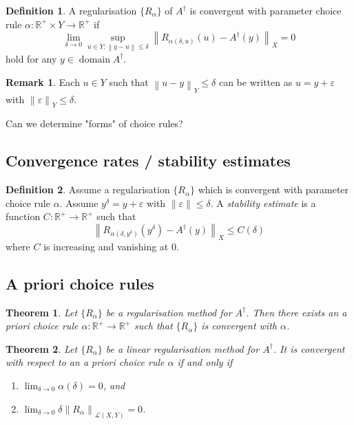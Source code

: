 \documentclass[12pt]{article}
\newtheorem{theorem}{Theorem}[section]
\theoremstyle{definition}
\newtheorem{definition}{Definition}[section]
\newtheorem*{remark}{Remark}
\newcommand{\real}{\mathbb{R}}   %
\newcommand{\eps}{\varepsilon}    %
\DeclareMathOperator{\domain}{domain}
\newcommand\norm[1]{\left\lVert#1\right\rVert}
\begin{document}
\begin{definition}
    A regularisation $\{R_\alpha\}$ of $A^\dagger $ is convergent with parameter choice rule $\alpha:\real^+\times Y\to \real^+$ if 
    \begin{equation*}
        \lim_{\delta\to 0} \sup_{u\in Y : \norm{y-u}\leq \delta} \norm{R_{\alpha(\delta,u)}(u) - A^\dagger (y)}_X=0
    \end{equation*} 
    hold for any $y\in \domain A^\dagger $.
\end{definition}
\begin{remark}
    Each $u\in Y$ such that $\norm{u-y}_Y\leq \delta$ can be written as $u=y+\eps$ with $\norm{\eps}_Y\leq \delta$.
\end{remark}

Can we determine "forms" of choice rules?

\subsection{Convergence rates / stability estimates}
\begin{definition}
    Assume a regularisation $\{R_\alpha\}$ which is convergent with parameter choice rule $\alpha$. Assume $y^\delta = y + \eps$ with $\norm{\eps}\leq \delta$. A \textit{stability estimate} is a function $C:\real^+\to\real^+$ such that 
    \begin{equation*}
        \norm{R_{\alpha(\delta,y^\delta)}(y^\delta) - A^\dagger (y)}_X \leq C(\delta)
    \end{equation*}
    where $C$ is increasing and vanishing at 0.
\end{definition}

\subsection{A priori choice rules}
\begin{theorem}
    Let $\{R_\alpha\}$ be a regularisation method for $A^\dagger $. Then there exists an a priori choice rule $\alpha:\real^+\to\real^+$ such that $\{R_\alpha\}$ is convergent with $\alpha$.
\end{theorem}

\begin{theorem}
    Let $\{R_\alpha\}$ be a linear regularisation method for $A^\dagger $. It is convergent with respect to an a priori choice rule $\alpha$ if and only if 
    \begin{enumerate}[label=(\alph*)]
        \item $\lim_{\delta\to 0} \alpha(\delta) = 0$, and 
        \item $\lim_{\delta\to 0} \delta\norm{R_\alpha}_{\mathcal{L}(X,Y)} = 0$.
    \end{enumerate}
\end{theorem}
\end{document}

